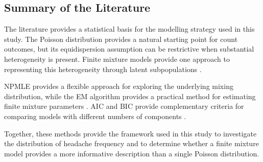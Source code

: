 \subsection{Summary of the Literature}

The literature provides a statistical basis for the modelling
strategy used in this study. The Poisson distribution provides a
natural starting point for count outcomes, but its equidispersion
assumption can be restrictive when substantial heterogeneity is
present. Finite mixture models provide one approach to representing
this heterogeneity through latent subpopulations
\citep{MolenberghsVerbeke2017,McLachlanPeel2000}.

NPMLE provides a flexible approach for exploring the underlying
mixing distribution, while the EM algorithm provides a practical
method for estimating finite mixture parameters
\citep{Lindsay1983,McLachlanPeel2000}. AIC and BIC provide
complementary criteria for comparing models with different numbers
of components \citep{Akaike1974,Schwarz1978}.

Together, these methods provide the framework used in this study to
investigate the distribution of headache frequency and to determine
whether a finite mixture model provides a more informative
description than a single Poisson distribution.